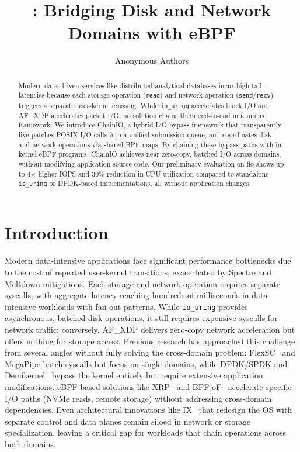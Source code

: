 \documentclass[sigconf,10pt]{acmart}
\title{\sys: Bridging Disk and Network Domains with eBPF}
\author{
Anonymous Authors
}
\newcommand{\sys}{ChainIO\xspace}
\begin{document}
\begin{abstract}
Modern data-driven services like distributed analytical databases incur high tail-latencies because each storage operation (\texttt{read}) and network operation (\texttt{send}/\texttt{recv}) triggers a separate user-kernel crossing. While \texttt{io\_uring} accelerates block I/O and AF\_XDP accelerates packet I/O, no solution chains them end-to-end in a unified framework. We introduce \sys, a hybrid I/O-bypass framework that transparently live-patches POSIX I/O calls into a unified submission queue, and coordinates disk and network operations via shared BPF maps. By chaining these bypass paths with in-kernel eBPF programs, \sys achieves near zero-copy, batched I/O across domains, without modifying application source code. Our preliminary evaluation on fio shows up to 4× higher IOPS and 30\% reduction in CPU utilization compared to standalone \texttt{io\_uring} or DPDK-based implementations, all without application changes.
\end{abstract}

\maketitle

\section{Introduction}

Modern data-intensive applications face significant performance bottlenecks due to the cost of repeated user-kernel transitions, exacerbated by Spectre and Meltdown mitigations. Each storage and network operation requires separate syscalls, with aggregate latency reaching hundreds of milliseconds in data-intensive workloads with fan-out patterns. While \texttt{io\_uring}\cite{iouring} provides asynchronous, batched disk operations, it still requires expensive syscalls for network traffic; conversely, AF\_XDP\cite{afxdp} delivers zero-copy network acceleration but offers nothing for storage access. Previous research has approached this challenge from several angles without fully solving the cross-domain problem: FlexSC~\cite{flexsc} and MegaPipe batch syscalls but focus on single domains, while DPDK/SPDK and Demikernel~\cite{zhang2021demikernel} bypass the kernel entirely but require extensive application modifications. eBPF-based solutions like XRP~\cite{Zhong22} and BPF-oF~\cite{zarkadas2023bpf} accelerate specific I/O paths (NVMe reads, remote storage) without addressing cross-domain dependencies. Even architectural innovations like IX~\cite{ix} that redesign the OS with separate control and data planes remain siloed in network or storage specialization, leaving a critical gap for workloads that chain operations across both domains.
\end{document}
